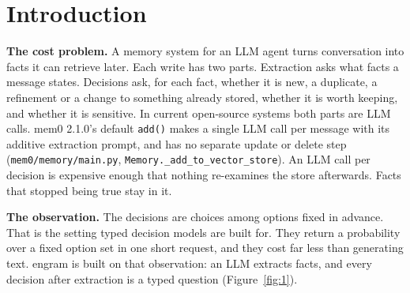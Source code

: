 \documentclass[11pt]{article}
\begin{document}
\section{Introduction}\label{sec:1}
\textbf{The cost problem.} A memory system for an LLM agent turns conversation into facts it can retrieve later. Each write has two parts. Extraction asks what facts a message states. Decisions ask, for each fact, whether it is new, a duplicate, a refinement or a change to something already stored, whether it is worth keeping, and whether it is sensitive. In current open-source systems both parts are LLM calls. mem0 2.1.0's default \texttt{add()} makes a single LLM call per message with its additive extraction prompt, and has no separate update or delete step (\texttt{mem0/\allowbreak{}memory/\allowbreak{}main.py}, \texttt{Memory.\_\allowbreak{}add\_\allowbreak{}to\_\allowbreak{}vector\_\allowbreak{}store}). An LLM call per decision is expensive enough that nothing re-examines the store afterwards. Facts that stopped being true stay in it.

\textbf{The observation.} The decisions are choices among options fixed in advance. That is the setting typed decision models are built for. They return a probability over a fixed option set in one short request, and they cost far less than generating text. engram is built on that observation: an LLM extracts facts, and every decision after extraction is a typed question (Figure~\ref{fig:1}).
\end{document}
